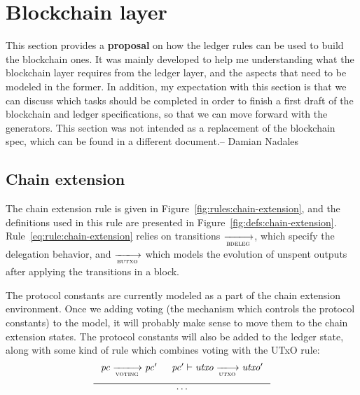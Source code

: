 \section{Blockchain layer}
\label{sec:blockchain-layer}

\begin{note}
  This section provides a \textbf{proposal} on how the ledger rules can be used
  to build the blockchain ones. It was mainly developed to help me
  understanding what the blockchain layer requires from the ledger layer, and
  the aspects that need to be modeled in the former. In addition, my
  expectation with this section is that we can discuss which tasks should be
  completed in order to finish a first draft of the blockchain and ledger
  specifications, so that we can move forward with the generators. This section
  was not intended as a replacement of the blockchain spec, which can be found
  in a different document.-- Damian Nadales
\end{note}

\subsection{Chain extension}
\label{sec:chain-extension}

The chain extension rule is given in Figure~\ref{fig:rules:chain-extension},
and the definitions used in this rule are presented in
Figure~\ref{fig:defs:chain-extension}. Rule~\ref{eq:rule:chain-extension}
relies on transitions $\trans{bdeleg}{}$, which specify the delegation
behavior, and $\trans{butxo}{}$ which models the evolution of unspent outputs
after applying the transitions in a block. 

\begin{note}
  The protocol constants are currently modeled as a part of the
  chain extension environment. Once we adding voting
  (the mechanism which controls the protocol constants)
  to the model, it will probably make sense to move them to the
  chain extension states. The protocol constants will also be
  added to the ledger state, along with some kind of rule which
  combines voting with the UTxO rule:
  \begin{equation*}
    \inference
    {
      \var{pc} \trans{voting}{} \var{pc'} &
      \var{pc'} \vdash \var{utxo} \trans{utxo}{} \var{utxo'}\\ ~ \\
    }
    {\ldots}
  \end{equation*}
\end{note}

